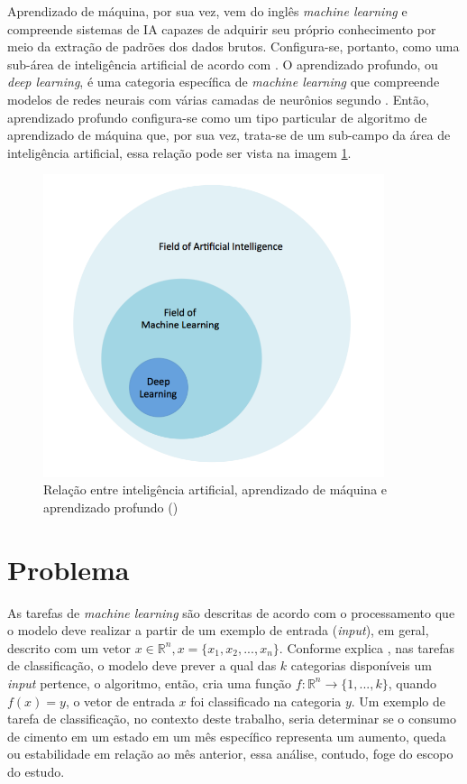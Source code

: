 Aprendizado de máquina, por sua vez, vem do inglês 
\textit{machine learning} e compreende sistemas de IA capazes 
de adquirir seu próprio conhecimento por meio da extração 
de padrões dos dados brutos. Configura-se, portanto, como 
uma sub-área de inteligência artificial de acordo com 
\cite{Goodfellow-et-al-2016}. O aprendizado profundo, ou 
\textit{deep learning}, é uma categoria específica de
 \textit{machine learning} que compreende modelos de redes 
 neurais com várias camadas de neurônios segundo \cite{d2l}. Então,
aprendizado profundo configura-se como um tipo particular de 
algoritmo de aprendizado de máquina que, por sua vez, trata-se
de um sub-campo da área de inteligência artificial, essa 
relação pode ser vista na imagem \ref{fig:ia_ml}.

\begin{figure}[H] 
  \includegraphics[width= 10cm]{../figuras/ia_ml.png}
  \caption{Relação entre inteligência artificial, aprendizado de máquina e aprendizado profundo (\cite{dl-oreilly})}
  \label{fig:ia_ml}
\end{figure}

\section{Problema}

As tarefas de \textit{machine learning} são descritas de acordo com o processamento 
que o modelo deve realizar a partir de um exemplo de entrada (\textit{input}), em geral, descrito com 
um vetor $x \in \mathbb{R}^n, x=\{x_1, x_2, ..., x_n\}$.
Conforme explica \cite{Goodfellow-et-al-2016}, nas tarefas de classificação, o modelo deve prever a qual das $k$ categorias 
disponíveis um \textit{input} pertence, o algoritmo, então, cria uma função  
$ f : \mathbb{R}^n \rightarrow \{1,...,k\}$,  quando 
$ f(x) = y$, o vetor de entrada $x$ foi classificado na categoria $y$. Um exemplo 
de tarefa de classificação, no contexto deste trabalho, seria determinar se o 
consumo de cimento em um estado em um mês específico 
representa um aumento, queda ou estabilidade em relação ao mês anterior, essa 
análise, contudo, foge do escopo do estudo.

